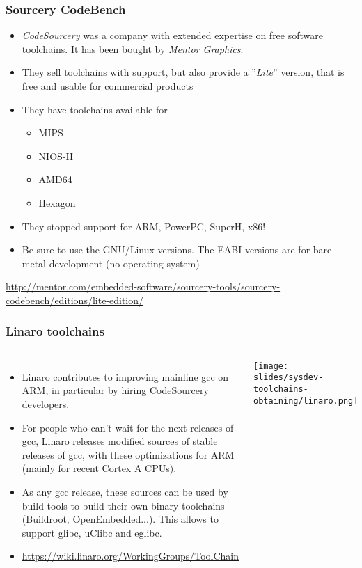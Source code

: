 \begin{frame}
  \frametitle{Sourcery CodeBench}
  \begin{itemize}
  \item {\em CodeSourcery} was a company with extended expertise
    on free software toolchains. It has been bought by
    {\em Mentor Graphics}.
  \item They sell toolchains with support, but also provide a
    ”{\em Lite}” version, that is free and usable for commercial
    products
  \item They have toolchains available for
    \begin{itemize}
    \item MIPS
    \item NIOS-II
    \item AMD64
    \item Hexagon
    \end{itemize}
  \item They stopped support for ARM, PowerPC, SuperH, x86!
  \item Be sure to use the GNU/Linux versions. The EABI versions are
    for bare-metal development (no operating system)
  \end{itemize}
  {\small
\url{http://mentor.com/embedded-software/sourcery-tools/sourcery-codebench/editions/lite-edition/}}
\end{frame}

\begin{frame}
  \frametitle{Linaro toolchains}
  \begin{columns}
    \begin{itemize}
    \item Linaro contributes to improving mainline gcc on ARM, in
      particular by hiring CodeSourcery developers.
    \item For people who can't wait for the next releases of gcc, Linaro
      releases modified sources of stable releases of gcc, with these
      optimizations for ARM (mainly for recent Cortex A CPUs).
    \item As any gcc release, these sources can be used by build tools
      to build their own binary toolchains (Buildroot, OpenEmbedded...).
      This allows to support glibc, uClibc and eglibc.
    \item \small\url{https://wiki.linaro.org/WorkingGroups/ToolChain}\normalsize
    \end{itemize}
    \texttt{[image: slides/sysdev-toolchains-obtaining/linaro.png]}
  \end{columns}
\end{frame}


